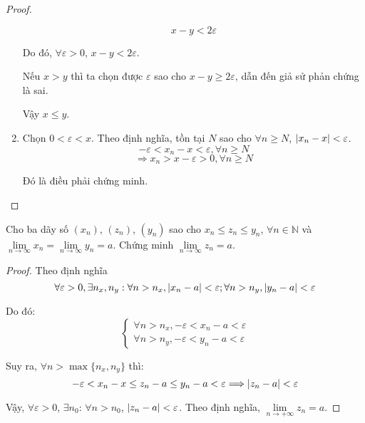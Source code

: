 \documentclass[class=analysis,crop=false]{standalone}
\begin{document}
\begin{proof}
\begin{enumerate}[label = (\roman*)]
\[                  x - y < 2\varepsilon
              \]
              \par Do đó, $\forall\varepsilon > 0$, $x - y < 2\varepsilon$.
              \par Nếu $x > y$ thì ta chọn được $\varepsilon$ sao cho $x - y \ge 2\varepsilon$, dẫn đến giả sử phản chứng là sai.
              \par Vậy $x\le y$.
        \item Chọn $0 < \varepsilon < x$. Theo định nghĩa, tồn tại $N$ sao cho $\forall n \ge N$, $\left\vert{x_{n} - x}\right\vert < \varepsilon$.
              \[
                  -\varepsilon < x_{n} - x < \varepsilon, \forall n\ge N
              \]
              \[
                  \Rightarrow x_{n} > x - \varepsilon > 0, \forall n\ge N
              \]
              \par Đó là điều phải chứng minh.
    \end{enumerate}
\end{proof}

\begin{exercise}
    Cho ba dãy số $(x_{n})$, $(z_{n})$, $(y_{n})$ sao cho $x_{n} \le z_{n} \le y_{n}$, $\forall n\in\mathbb{N}$ và $\lim\limits_{n\to\infty} x_{n} = \lim\limits_{n\to\infty} y_{n} = a$. Chứng minh $\lim\limits_{n\to\infty} z_{n} = a$.
\end{exercise}

\begin{proof}
    \par Theo định nghĩa
    \[
        \forall\varepsilon > 0, \exists n_{x}, n_{y}: \forall n > n_{x}, \left\vert{x_{n} - a}\right\vert < \varepsilon; \forall n > n_{y}, \left\vert{y_{n} - a}\right\vert < \varepsilon
    \]
    \par Do đó:
    \[
        \begin{cases}
            \forall n > n_{x}, -\varepsilon < x_{n} - a < \varepsilon \\
            \forall n > n_{y}, -\varepsilon < y_{n} - a < \varepsilon
        \end{cases}
    \]
    \par Suy ra, $\forall n > \max\{ n_{x}, n_{y} \}$ thì:
    \[
        -\varepsilon < x_{n} - x \le z_{n} - a \le y_{n} - a < \varepsilon \Longrightarrow \left\vert{z_{n} - a}\right\vert < \varepsilon
    \]
    \par Vậy, $\forall\varepsilon > 0$, $\exists n_{0}$: $\forall n > n_{0}$, $\left\vert{z_{n} - a}\right\vert < \varepsilon$. Theo định nghĩa, $\lim\limits_{n\to+\infty}z_{n} = a$.
\end{proof}
\end{document}
